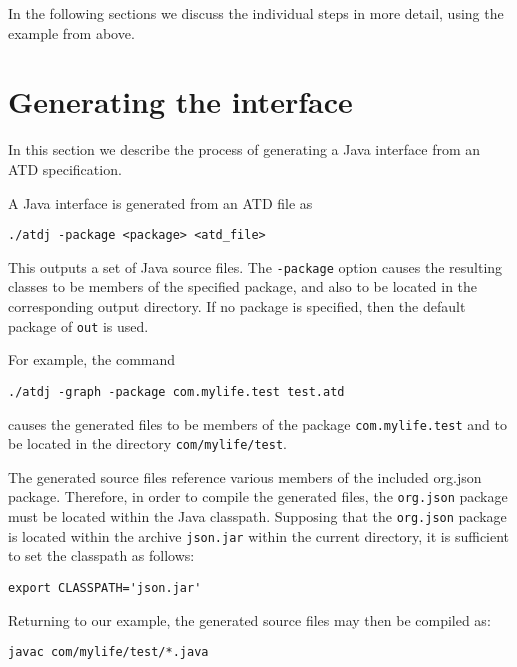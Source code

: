 In the following sections we discuss the individual steps in more detail,
using the example from above.


\section{Generating the interface}

In this section we describe the process of generating a Java interface from an
ATD specification.

A Java interface is generated from an ATD file as

\begin{verbatim}
./atdj -package <package> <atd_file>
\end{verbatim}

This outputs a set of Java source files.  The \texttt{-package} option
causes the
resulting classes to be members of the specified package, and also to
be located
in the corresponding output directory.  If no package is specified, then the
default package of \texttt{out} is used.

For example, the command

\begin{verbatim}
./atdj -graph -package com.mylife.test test.atd
\end{verbatim}

\begin{sloppypar}
causes the generated files to be members of the package
\texttt{com.mylife.test} and to be located in the directory
\texttt{com/mylife/test}.
\end{sloppypar}

The generated source files reference various members of the included org.json
package.  Therefore, in order to compile the generated files, the
\texttt{org.json}
package must be located within the Java classpath.  Supposing that the
\texttt{org.json}
package is located within the archive \texttt{json.jar} within the
current directory,
it is sufficient to set the classpath as follows:

\begin{verbatim}
export CLASSPATH='json.jar'
\end{verbatim}

Returning to our example, the generated source files may then be compiled as:

\begin{verbatim}
javac com/mylife/test/*.java
\end{verbatim}

